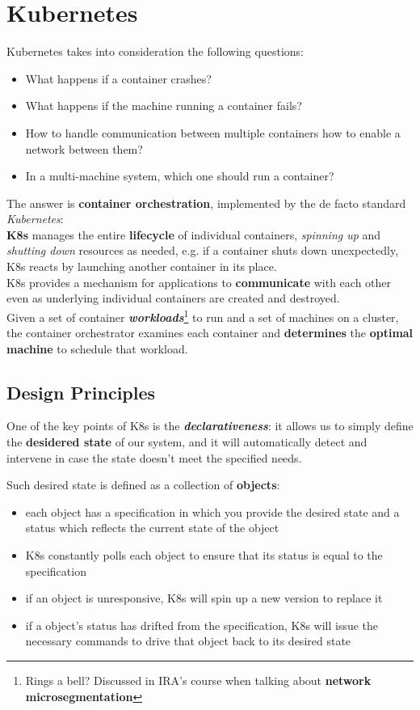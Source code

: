 \chapter{Kubernetes}

Kubernetes takes into consideration the following questions:
\begin{itemize}
   \item What happens if a container crashes?
   \item What happens if the machine running a container fails?
   \item How to handle communication between multiple containers how to enable a network between them?
   \item In a multi-machine system, which one should run a container?
\end{itemize}

The answer is \textbf{container orchestration}, implemented by the de facto standard \textit{Kubernetes}:\\
\textbf{K8s} manages the entire \textbf{lifecycle} of individual containers, \textit{spinning up} and \textit{shutting down} resources as needed,
e.g.
if a container shuts down unexpectedly, K8s reacts by launching another container in its place.\\
K8s provides a mechanism for applications to \textbf{communicate} with each other
even as underlying individual containers are created and destroyed.\\
Given a set of container \textbf{\textit{workloads}}\footnote{Rings a bell? Discussed in IRA's course when talking about \textbf{network microsegmentation}} to run and a set of machines on a cluster,
the container orchestrator examines each container and \textbf{determines} the
\textbf{optimal machine} to schedule that workload.

\section{Design Principles}
One of the key points of K8s is the \textit{\textbf{declarativeness}}:
it allows us to simply define the \textbf{desidered state} of our system,
and it will automatically detect and intervene in case the state doesn't meet the specified needs.

Such desired state is defined as a collection of \textbf{objects}:
\begin{itemize}
   \item each object has a specification in which you provide the desired state and a status which reflects the current state of the object
   \item K8s constantly polls each object to ensure that its status is equal to the specification
   \item if an object is unresponsive, K8s will spin up a new version to replace it
   \item if a object's status has drifted from the specification, K8s will issue the necessary commands
   to drive that object back to its desired state
\end{itemize}


